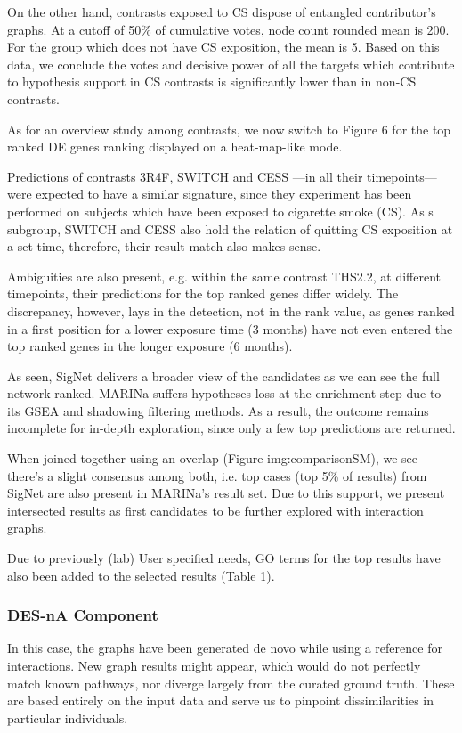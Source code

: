 On the other hand, contrasts exposed to CS dispose of entangled contributor’s graphs. At a cutoff of 50\% of cumulative votes, node count rounded mean is 200. For the group which does not have CS exposition, the mean is 5. Based on this data, we conclude the votes and decisive power of all the targets which contribute to hypothesis support in CS contrasts is significantly lower than in non-CS contrasts.

As for an overview study among contrasts, we now switch to Figure 6 for the top ranked DE genes ranking displayed on a heat-map-like mode.

Predictions of contrasts 3R4F, SWITCH and CESS —in all their timepoints—were expected to have a similar signature, since they experiment has been performed on subjects which have been exposed to cigarette smoke (CS). As s subgroup, SWITCH and CESS also hold the relation of quitting CS exposition at a set time, therefore, their result match also makes sense.

Ambiguities are also present, e.g. within the same contrast THS2.2, at different timepoints, their predictions for the top ranked genes differ widely. The discrepancy, however, lays in the detection, not in the rank value, as genes ranked in a first position for a lower exposure time (3 months) have not even entered the top ranked genes in the longer exposure (6 months).

As seen, SigNet delivers a broader view of the candidates as we can see the full network ranked. MARINa suffers hypotheses loss at the enrichment step due to its GSEA and shadowing filtering methods. As a result, the outcome remains incomplete for in-depth exploration, since only a few top predictions are returned.

When joined together using an overlap (Figure img:comparisonSM), we see there’s a slight consensus among both, i.e. top cases (top 5\% of results) from SigNet are also present in MARINa’s result set. Due to this support, we present intersected results as first candidates to be further explored with interaction graphs.

Due to previously (lab) User specified needs, GO terms for the top results have also been added to the selected results (Table 1).

\subsubsection{DES-nA Component}
In this case, the graphs have been generated de novo while using a reference for interactions. New graph results might appear, which would do not perfectly match known pathways, nor diverge largely from the curated ground truth. These are based entirely on the input data and serve us to pinpoint dissimilarities in particular individuals.

